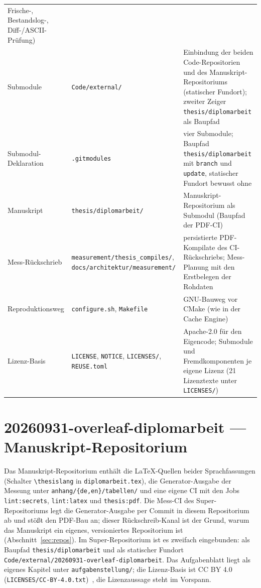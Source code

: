 {\begin{longtable}{@{}>{\raggedright\arraybackslash}p{}>{\raggedright\arraybackslash}p{}>{\raggedright\arraybackslash}p{}@{}}
Frische-, Bestandslog-, Diff-/ASCII-Prüfung) \\
Submodule &
\texttt{Code/\allowbreak{}external/} &
Einbindung der beiden Code-Repositorien und des Manuskript-Repositoriums (statischer Fundort); zweiter
Zeiger \texttt{thesis/\allowbreak{}diplomarbeit} als Baupfad \\
Submodul-Deklaration &
\texttt{.gitmodules} &
vier Submodule; Baupfad \texttt{thesis/\allowbreak{}diplomarbeit} mit \texttt{branch} und \texttt{update},
statischer Fundort bewusst ohne \\
Manuskript &
\texttt{thesis/\allowbreak{}diplomarbeit/} &
Manuskript-Repositorium als Submodul (Baupfad der PDF-CI) \\
Mess-Rückschrieb &
\texttt{measurement/\allowbreak{}thesis\_compiles/}, \texttt{docs/\allowbreak{}architektur/\allowbreak{}measurement/} &
persistierte PDF-Kompilate des CI-Rückschriebs; Mess-Planung mit den Erstbelegen der Rohdaten \\
Reproduktionsweg &
\texttt{configure.sh}, \texttt{Makefile} &
GNU-Bauweg vor CMake (wie in der Cache Engine) \\
Lizenz-Basis &
\texttt{LICENSE}, \texttt{NOTICE}, \texttt{LICENSES/}, \texttt{REUSE.toml} &
Apache-2.0 für den Eigencode; Submodule und Fremdkomponenten je eigene Lizenz (21 Lizenztexte unter
\texttt{LICENSES/}) \\
\end{longtable}
}

\section*{20260931-overleaf-diplomarbeit --- Manuskript-Repositorium}

Das Manuskript-Repositorium enthält die LaTeX-Quellen beider Sprachfassungen (Schalter
\texttt{\textbackslash{}thesislang} in \texttt{diplomarbeit.tex}), die Generator-Ausgabe der Messung unter
\texttt{anhang/\allowbreak{}\{de,en\}/\allowbreak{}tabellen/} und eine eigene CI mit den Jobs
\texttt{lint:secrets}, \texttt{lint:latex} und \texttt{thesis:pdf}. Die Mess-CI des Super-Repositoriums
legt die Generator-Ausgabe per Commit in diesem Repositorium ab und stößt den PDF-Bau an; dieser
Rückschreib-Kanal ist der Grund, warum das Manuskript ein eigenes, versioniertes Repositorium ist
(Abschnitt~\ref{sec:repos}). Im Super-Repositorium ist es zweifach eingebunden: als Baupfad
\texttt{thesis/\allowbreak{}diplomarbeit} und als statischer Fundort
\texttt{Code/\allowbreak{}external/\allowbreak{}20260931-\allowbreak{}overleaf-\allowbreak{}diplomarbeit}. Das
Aufgabenblatt liegt als eigenes Kapitel unter \texttt{aufgabenstellung/}; die Lizenz-Basis ist CC BY 4.0
(\texttt{LICENSES/\allowbreak{}CC-BY-4.0.txt})~\cite{cc2013by40}, die Lizenzaussage steht im Vorspann.

